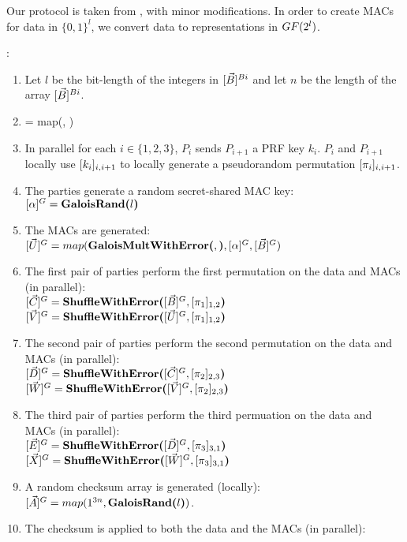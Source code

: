 Our protocol is taken from \cite{CCS:AHIKNPTT22}, with minor modifications.
In order to create MACs for data in $\{0,1\}^l$, 
we convert data to representations in $GF(2^l)$.


\begin{protocol}[Shuffle]
	:
	\begin{enumerate}
		\item Let $l$ be the bit-length of the integers in $[\vec{B}]^{Bi}$
			and let $n$ be the length of the array $[\vec{B}]^{Bi}$.
		\item {} = map(\BoolArrToGal{\InttoBitArr{\cdot}}, )
		\item In parallel for each $i \in \{1,2,3\}$, 
			$P_i$ sends $P_{i+1}$ a PRF key $k_i$.
			$P_i$ and $P_{i+1}$ locally use $[k_i]_{i,i+1}$
			to locally generate a pseudorandom permutation
			$[\pi_i]_{i,i+1}$.
		\item The parties generate a random secret-shared MAC key:\\
			$[\alpha]^{G} = \textbf{GaloisRand(}l\textbf{)}$
		\item The MACs are generated:\\
			$[\vec{U}]^{G} = map(\textbf{GaloisMultWithError(}, \textbf{)}, [\alpha]^{G}, [\vec{B}]^{G})$
		\item The first pair of parties perform the first permutation on the data and MACs
			(in parallel):\\
			$[\vec{C}]^{G} = \textbf{ShuffleWithError(}[\vec{B}]^{G}, [\pi_1]_{1,2}\textbf{)}$ \\
			$[\vec{V}]^{G} = \textbf{ShuffleWithError(}[\vec{U}]^{G}, [\pi_1]_{1,2}\textbf{)}$
		\item The second pair of parties perform the second permutation on the data and 
			MACs (in parallel):\\
				$[\vec{D}]^{G} = \textbf{ShuffleWithError(}[\vec{C}]^{G}, [\pi_2]_{2,3}\textbf{)}$ \\
				$[\vec{W}]^{G} = \textbf{ShuffleWithError(}[\vec{V}]^{G}, [\pi_2]_{2,3}\textbf{)}$
		\item The third pair of parties perform the third permuation on the data and MACs
			(in parallel): \\
				$[\vec{E}]^{G} = \textbf{ShuffleWithError(}[\vec{D}]^{G}, [\pi_3]_{3,1}\textbf{)}$ \\
				$[\vec{X}]^{G} = \textbf{ShuffleWithError(}[\vec{W}]^{G}, [\pi_3]_{3,1}\textbf{)}$
		\item A random checksum array is generated (locally):\\ 
			$[\vec{A}]^{G} = map(1^{3n}, \textbf{GaloisRand(}l\textbf{)})$.
		\item The checksum is applied to both the data and the MACs (in parallel):\\

\end{enumerate}
\end{protocol}
